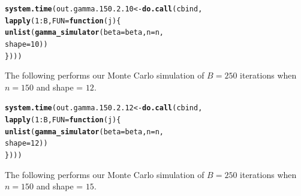 \documentclass[11pt]{article}\usepackage[]{graphicx}\usepackage[]{color}
\makeatletter
\newcommand{\hlnum}[1]{\textcolor[rgb]{0.686,0.059,0.569}{#1}}%
\newcommand{\hlopt}[1]{\textcolor[rgb]{0,0,0}{#1}}%
\newcommand{\hlstd}[1]{\textcolor[rgb]{0.345,0.345,0.345}{#1}}%
\newcommand{\hlkwa}[1]{\textcolor[rgb]{0.161,0.373,0.58}{\textbf{#1}}}%
\newcommand{\hlkwb}[1]{\textcolor[rgb]{0.69,0.353,0.396}{#1}}%
\newcommand{\hlkwc}[1]{\textcolor[rgb]{0.333,0.667,0.333}{#1}}%
\newcommand{\hlkwd}[1]{\textcolor[rgb]{0.737,0.353,0.396}{\textbf{#1}}}%
\newenvironment{kframe}{%
 \def\at@end@of@kframe{}%
 \ifinner\ifhmode%
  \def\at@end@of@kframe{\end{minipage}}%
  \begin{minipage}{\columnwidth}%
 \fi\fi%
 \def\FrameCommand##1{\hskip\@totalleftmargin \hskip-\fboxsep
 \colorbox{shadecolor}{##1}\hskip-\fboxsep
     \hskip-\linewidth \hskip-\@totalleftmargin \hskip\columnwidth}%
 \MakeFramed {\advance\hsize-\width
   \@totalleftmargin\z@ \linewidth\hsize
   \@setminipage}}%
 {\par\unskip\endMakeFramed%
 \at@end@of@kframe}
\newenvironment{knitrout}{}{} %
\makeatother
\begin{document}
\begin{knitrout}
\color{fgcolor}\begin{kframe}
\begin{alltt}
\hlkwd{system.time}\hlstd{(out.gamma.150.2.10} \hlkwb{<-} \hlkwd{do.call}\hlstd{(cbind,}
  \hlkwd{lapply}\hlstd{(}\hlnum{1}\hlopt{:}\hlstd{B,} \hlkwc{FUN} \hlstd{=} \hlkwa{function}\hlstd{(}\hlkwc{j}\hlstd{)\{}
    \hlkwd{unlist}\hlstd{(}\hlkwd{gamma_simulator}\hlstd{(}\hlkwc{beta} \hlstd{= beta,} \hlkwc{n} \hlstd{= n,}
      \hlkwc{shape} \hlstd{=} \hlnum{10}\hlstd{))}
\hlstd{\})))}
\end{alltt}


{\ttfamily\noindent\bfseries\color{errorcolor}{\#\# Error in r[, l]/mad.predict.fun(out.mad, xx): non-numeric argument to binary operator}}

{\ttfamily\noindent\itshape\color{messagecolor}{\#\# Timing stopped at: 1.494 0 1.495}}\end{kframe}
\end{knitrout}


The following performs our Monte Carlo simulation of $B = 250$ iterations 
when $n = 150$ and shape = $12$.

\begin{knitrout}
\color{fgcolor}\begin{kframe}
\begin{alltt}
\hlkwd{system.time}\hlstd{(out.gamma.150.2.12} \hlkwb{<-} \hlkwd{do.call}\hlstd{(cbind,}
  \hlkwd{lapply}\hlstd{(}\hlnum{1}\hlopt{:}\hlstd{B,} \hlkwc{FUN} \hlstd{=} \hlkwa{function}\hlstd{(}\hlkwc{j}\hlstd{)\{}
    \hlkwd{unlist}\hlstd{(}\hlkwd{gamma_simulator}\hlstd{(}\hlkwc{beta} \hlstd{= beta,} \hlkwc{n} \hlstd{= n,}
      \hlkwc{shape} \hlstd{=} \hlnum{12}\hlstd{))}
\hlstd{\})))}
\end{alltt}


{\ttfamily\noindent\bfseries\color{errorcolor}{\#\# Error in r[, l]/mad.predict.fun(out.mad, xx): non-numeric argument to binary operator}}

{\ttfamily\noindent\itshape\color{messagecolor}{\#\# Timing stopped at: 1.766 0 1.767}}\end{kframe}
\end{knitrout}


The following performs our Monte Carlo simulation of $B = 250$ iterations 
when $n = 150$ and shape = $15$.
\end{document}
